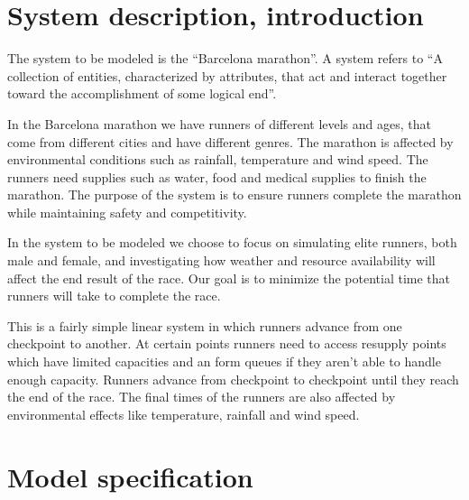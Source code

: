 \documentclass[conference]{IEEEtran}
\begin{document}
% 
\section{System description, introduction}
The system to be modeled is the ``Barcelona marathon''. A system refers to ``A collection of entities, characterized by attributes, that act and interact together toward the accomplishment of some logical end''. 

In the Barcelona marathon we have runners of different levels and ages, that come from different cities and have different genres. The marathon is affected by environmental conditions such as rainfall, temperature and wind speed. The runners need supplies such as water, food and medical supplies to finish the marathon. The purpose of the system is to ensure runners complete the marathon  while maintaining safety and competitivity.

In the system to be modeled we choose to focus on simulating elite runners, both male and female, and investigating how weather and resource availability will affect the end result of the race. Our goal is to minimize the potential time that runners will take to complete the race.

This is a fairly simple linear system in which runners advance from one checkpoint to another. At certain points runners need to access resupply points which have limited capacities and an form queues if they aren't able to handle enough capacity. Runners advance from checkpoint to checkpoint until they reach the end of the race. The final times of the runners are also affected by environmental effects like temperature, rainfall and wind speed.


\section{Model specification}
\end{document}
